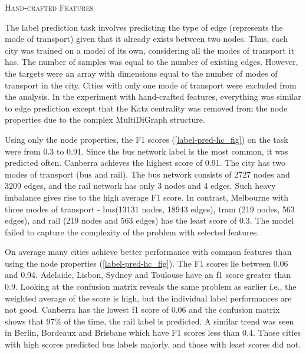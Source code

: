 \documentclass{article}
\theoremstyle{plain}
\theoremstyle{definition}
\theoremstyle{remark}
\begin{document}

\textsc{Hand-crafted Features}

The label prediction task involves predicting the type of edge (represents the mode of transport) given that it already exists between two nodes. Thus, each city was trained on a model of its own, considering all the modes of transport it has. The number of samples was equal to the number of existing edges. However, the targets were an array with dimensions equal to the number of modes of transport in the city. Cities with only one mode of transport were excluded from the analysis. In the experiment with hand-crafted features, everything was similar to edge prediction except that the Katz centrality was removed from the node properties due to the complex MultiDiGraph structure.

Using only the node properties, the F1 scores (\cref{label-pred-hc_fig}) on the task were from 0.3 to 0.91. Since the bus network label is the most common, it was predicted often. Canberra achieves the highest score of 0.91. The city has two modes of transport (bus and rail). The bus network consists of 2727 nodes and 3209 edges, and the rail network has only 3 nodes and 4 edges. Such heavy imbalance gives rise to the high average F1 score. In contrast, Melbourne with three modes of transport - bus(13131 nodes, 18943 edges), tram (219 nodes, 563 edges), and rail (219 nodes and 563 edges) has the least score of 0.3. The model failed to capture the complexity of the problem with selected features.

On average many cities achieve better performance with common features than using the node properties (\cref{label-pred-hc_fig}). The F1 scores lie between 0.06 and 0.94. Adelaide, Lisbon, Sydney and Toulouse have an f1 score greater than 0.9. Looking at the confusion matrix reveals the same problem as earlier i.e., the weighted average of the score is high, but the individual label performances are not good. Canberra has the lowest f1 score of 0.06 and the confusion matrix shows that 97\% of the time, the rail label is predicted. A similar trend was seen in Berlin, Bordeaux and Brisbane which have F1 scores less than 0.4. Those cities with high scores predicted bus labels majorly, and those with least scores did not.
\end{document}
